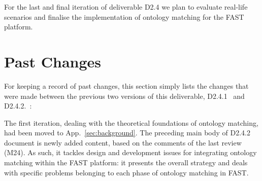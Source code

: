 \documentclass{fast_latex}
\begin{document}
For the last and final iteration of deliverable D2.4 we plan to evaluate real-life scenarios and finalise the implementation of ontology matching for the FAST platform.



\clearpage
{}
\appendix




\clearpage
{}
\section{Past Changes} %
\label{sec:old_changes}

For keeping a record of past changes, this section simply lists the changes that were made between the previous two versions of this deliverable, D2.4.1~\cite{ambrus2009mediation} and D2.4.2.~\cite{ambrus2010mediation}:

The first iteration, dealing with the theoretical foundations of ontology matching, had been moved to App.~\ref{sec:background}. The preceding main body of D2.4.2 document is newly added content, based on the comments of the last review (M24). As such, it tackles design and development issues for integrating ontology matching within the FAST platform: it presents the overall strategy and deals with specific problems belonging to each phase of ontology matching in FAST.


\clearpage


\end{document}

